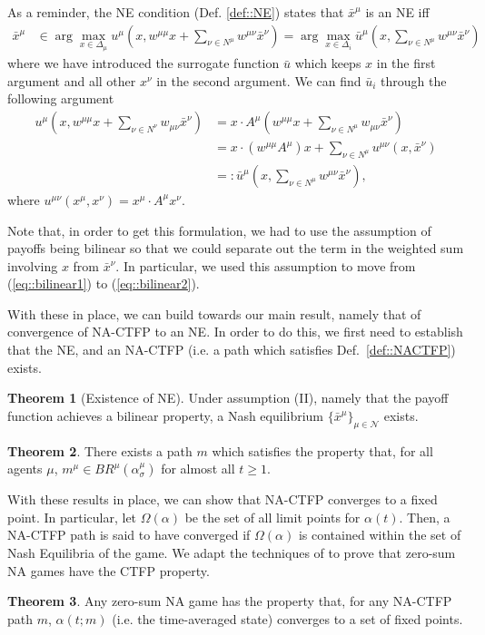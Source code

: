 \documentclass{article}
\theoremstyle{definition}
\newtheorem{theorem}{Theorem}
\newcommand{\agentset}{\mathcal{N}}
\newcommand{\xmu}{x^{\mu}}
\newcommand{\xnu}{x^{\nu}}
\newcommand{\NE}[1]{\bar{x}^{#1}}
\begin{document}
  As a reminder, the NE condition (Def. \ref{def::NE}) states that $\NE{\mu}$ is an NE iff
%
  \begin{align*}
    \NE{\mu} &\in \arg\max_{x \in \Delta_\mu} u^\mu(x, w^{\mu \mu}x + \sum_{\nu \in N^\mu} w^{\mu \nu} \NE{\nu}) \nonumber  = \arg\max_{x \in \Delta_i} \bar{u}^\mu(x, \sum_{\nu \in N^\mu} w^{\mu \nu} \NE{\nu})
  \end{align*}
%
  where we have introduced the surrogate function $\bar{u}$ which keeps $x$ in the first argument and all other $\xnu$ in the second argument. We can find $\bar{u}_i$ through the following argument
%  
  \begin{align}
    u^\mu(x, w^{\mu \mu} x + \sum_{\nu \in N^\nu} w_{\mu \nu} \NE{\nu}) & = x \cdot A^\mu (w^{\mu \mu} x + \sum_{\nu \in N^\mu} w_{\mu \nu} \NE{\nu}) \label{eq::bilinear1}\\
     & = x \cdot (w^{\mu \mu} A^\mu)  x + \sum_{\nu \in N^\mu} u^{\mu \nu}(x, \NE{\nu}) \label{eq::bilinear2} \\
     & =: \bar{u}^\mu(x, \sum_{\nu \in N^\mu} w^{\mu \nu} \NE{\nu}), \nonumber
  \end{align}
%  
  where $u^{\mu \nu}(\xmu, x^\nu) = \xmu \cdot A^\mu x^\nu$.

  Note
  that, in order to get this formulation, we had to use the assumption
  of payoffs being bilinear so that we could separate out the term in
  the weighted sum involving $x$ from $\bar{x}^\nu$. In particular, we used this assumption to move from (\ref{eq::bilinear1}) to (\ref{eq::bilinear2}).

  With these in place, we can build towards our main result, namely that of convergence of NA-CTFP to an NE. In order to do this, we first need to establish that the NE, and an NA-CTFP (i.e. a path which satisfies Def.~\ref{def::NACTFP}) exists.
  
  \begin{theorem}[Existence of NE]
    Under assumption (II), namely that the payoff function achieves a bilinear property, a
    Nash equilibrium $\{\bar{x}^\mu\}_{\mu \in \agentset}$ exists.
  \end{theorem}

  \begin{theorem}
    There exists a path $m$ which satisfies the property that, for all agents $\mu$, $m^\mu \in
    BR^\mu(\alpha_\sigma^\mu)$ for almost all $t \geq 1$.
  \end{theorem}

With these results in place, we can show that NA-CTFP converges
to a fixed point. In particular, let $\Omega(\alpha)$ be the set of
all limit points for $\alpha(t)$. Then, a NA-CTFP path is said to have
converged if $\Omega(\alpha)$ is contained within the set of Nash
Equilibria of the game. We adapt the techniques
of \cite{Ewerhart2020} to prove that zero-sum NA games have the CTFP
property.
%
  \begin{theorem} \label{thm::NACTFPtoFixed}
    Any zero-sum NA game has the property that, for any NA-CTFP path $m$, $\alpha(t; m)$ (i.e. the time-averaged state) converges to a set of fixed points.
  \end{theorem}
\end{document}

